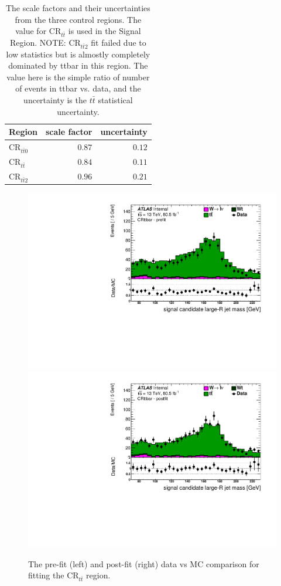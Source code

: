 \begin{table}
  \centering
  \caption{The \ttbar scale factors and their uncertainties from the three \ttbar
control regions. The value for $\text{CR}_{t\bar{t}}$ is used in the Signal Region. NOTE:
$\text{CR}_{t\bar{t}2}$ fit failed due to low statistics but is almostly completely dominated
by ttbar in this region.  The value here is the simple ratio of number of events in ttbar
vs. data, and the uncertainty is the $t\bar{t}$ statistical uncertainty.}
  \begin{tabular}{@{}lrr@{}}
    \toprule
    Region & scale factor & uncertainty \\
    \midrule
    $\text{CR}_{t\bar{t}0}$ & $0.87$ & $0.12$ \\
    $\text{CR}_{t\bar{t}}$  & $0.84$ & $0.11$ \\
    $\text{CR}_{t\bar{t}2}$ & $0.96$ & $0.21$ \\
    \bottomrule
  \end{tabular}
  \label{table:ttbar_kfactors}
\end{table}

\begin{figure}[!htbp]
\centering
\includegraphics[width=0.49\linewidth]{figures/backgrounds/ttbar_prefit} \hfill
\includegraphics[width=0.49\linewidth]{figures/backgrounds/ttbar_postfit}
\caption{The pre-fit (left) and post-fit (right) data vs MC comparison for fitting the $\text{CR}_{t\bar{t}}$ region.}
\label{sec:background:ttbar_fit}
\end{figure}

